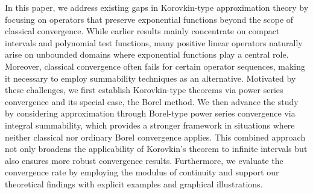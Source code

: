 \documentclass{amsart}
\theoremstyle{plain}
\numberwithin{equation}{section}
\begin{document}

In this paper, we address existing gaps in Korovkin-type approximation theory by focusing on operators that preserve exponential functions beyond the scope of classical convergence. While earlier results mainly concentrate on compact intervals and polynomial test functions, many positive linear operators naturally arise on unbounded domains where exponential functions play a central role. Moreover, classical convergence often fails for certain operator sequences, making it necessary to employ summability techniques as an alternative. Motivated by these challenges, we first establish Korovkin-type theorems via power series convergence and its special case, the Borel method. We then advance the study by considering approximation through Borel-type power series convergence via integral summability, which provides a stronger framework in situations where neither classical nor ordinary Borel convergence applies. This combined approach not only broadens the applicability of Korovkin’s theorem to infinite intervals but also ensures more robust convergence results. Furthermore, we evaluate the convergence rate by employing the modulus of continuity and support our theoretical findings with explicit examples and graphical illustrations.

\end{document}

